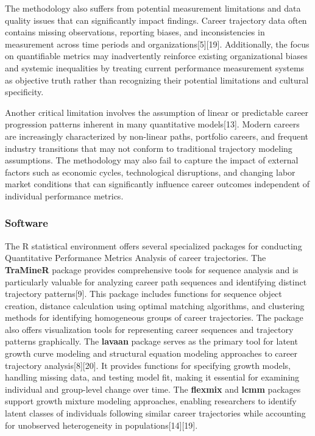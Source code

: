 \documentclass[main.tex]{subfiles}
\begin{document}
The methodology also suffers from potential measurement limitations and data quality issues that can significantly impact findings. Career trajectory data often contains missing observations, reporting biases, and inconsistencies in measurement across time periods and organizations[5][19]. Additionally, the focus on quantifiable metrics may inadvertently reinforce existing organizational biases and systemic inequalities by treating current performance measurement systems as objective truth rather than recognizing their potential limitations and cultural specificity.

Another critical limitation involves the assumption of linear or predictable career progression patterns inherent in many quantitative models[13]. Modern careers are increasingly characterized by non-linear paths, portfolio careers, and frequent industry transitions that may not conform to traditional trajectory modeling assumptions. The methodology may also fail to capture the impact of external factors such as economic cycles, technological disruptions, and changing labor market conditions that can significantly influence career outcomes independent of individual performance metrics.

\subsubsection{Software}

The R statistical environment offers several specialized packages for conducting Quantitative Performance Metrics Analysis of career trajectories. The \textbf{TraMineR} package provides comprehensive tools for sequence analysis and is particularly valuable for analyzing career path sequences and identifying distinct trajectory patterns[9]. This package includes functions for sequence object creation, distance calculation using optimal matching algorithms, and clustering methods for identifying homogeneous groups of career trajectories. The package also offers visualization tools for representing career sequences and trajectory patterns graphically. The \textbf{lavaan} package serves as the primary tool for latent growth curve modeling and structural equation modeling approaches to career trajectory analysis[8][20]. It provides functions for specifying growth models, handling missing data, and testing model fit, making it essential for examining individual and group-level change over time. The \textbf{flexmix} and \textbf{lcmm} packages support growth mixture modeling approaches, enabling researchers to identify latent classes of individuals following similar career trajectories while accounting for unobserved heterogeneity in populations[14][19].
\end{document}

